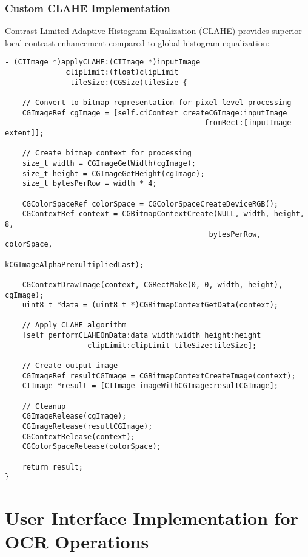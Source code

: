 \subsubsection{Custom CLAHE Implementation}

Contrast Limited Adaptive Histogram Equalization (CLAHE) provides superior local contrast enhancement compared to global histogram equalization:

\begin{verbatim}
- (CIImage *)applyCLAHE:(CIImage *)inputImage 
              clipLimit:(float)clipLimit 
               tileSize:(CGSize)tileSize {
    
    // Convert to bitmap representation for pixel-level processing
    CGImageRef cgImage = [self.ciContext createCGImage:inputImage 
                                              fromRect:[inputImage extent]];
    
    // Create bitmap context for processing
    size_t width = CGImageGetWidth(cgImage);
    size_t height = CGImageGetHeight(cgImage);
    size_t bytesPerRow = width * 4;
    
    CGColorSpaceRef colorSpace = CGColorSpaceCreateDeviceRGB();
    CGContextRef context = CGBitmapContextCreate(NULL, width, height, 8, 
                                               bytesPerRow, colorSpace,
                                               kCGImageAlphaPremultipliedLast);
    
    CGContextDrawImage(context, CGRectMake(0, 0, width, height), cgImage);
    uint8_t *data = (uint8_t *)CGBitmapContextGetData(context);
    
    // Apply CLAHE algorithm
    [self performCLAHEOnData:data width:width height:height 
                   clipLimit:clipLimit tileSize:tileSize];
    
    // Create output image
    CGImageRef resultCGImage = CGBitmapContextCreateImage(context);
    CIImage *result = [CIImage imageWithCGImage:resultCGImage];
    
    // Cleanup
    CGImageRelease(cgImage);
    CGImageRelease(resultCGImage);
    CGContextRelease(context);
    CGColorSpaceRelease(colorSpace);
    
    return result;
}
\end{verbatim}

\section{User Interface Implementation for OCR Operations}


